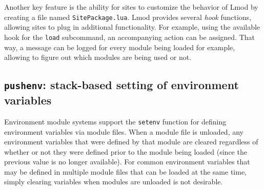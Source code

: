 Another key feature is the ability for sites to customize the behavior of Lmod
by creating a file named \texttt{\small SitePackage.lua}. Lmod provides several
\emph{hook} functions, allowing sites to plug in additional functionality.
For example, using the available hook for the \texttt{\small load} subcommand, an
accompanying action can be assigned. That way, a message can be logged for every
module being loaded for example, allowing to figure out which modules are being
used or not. 


\subsection{\texttt{\small pushenv}: stack-based setting of environment variables}
\label{sec:lmod_pushenv}

Environment module systems support the \texttt{\small setenv} function for 
defining environment variables via module files. When a module file is unloaded,
any environment variables that were defined by that module are cleared regardless
of whether or not they were defined prior to the module being loaded (since the
previous value is no longer available). For common environment variables that may
be defined in multiple module files that can be loaded at the same time, simply
clearing variables when modules are unloaded is not desirable.

